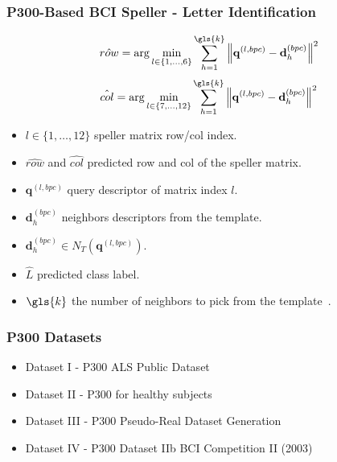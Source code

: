 \documentclass[aspectratio=169]{beamer}
\begin{document}
\begin{frame}
\frametitle{P300-Based BCI Speller - Letter Identification}
\begin{center}
\vspace{-\baselineskip}
\vspace{-\baselineskip}
\begin{equation}
\hat{row} = \arg \min_{l \in \{1,\dots,6\}} \sum_{h=1}^{\gls{k}}  {\left\lVert \mathbf{q}^{(l,bpc)} -  \mathbf{d}_{h}^{(bpc)} \right\rVert}  ^{2}
\label{eq:multiclassificationrow}
\end{equation}
\begin{equation}
\hat{col} = \arg \min_{l \in \{7,\dots,12\}} \sum_{h=1}^{\gls{k}}  {\left\lVert \mathbf{q}^{(l,bpc)} -  \mathbf{d}_{h}^{(bpc)} \right\rVert}  ^{2}
\label{eq:multiclassificationcol}
\end{equation}

\begin{itemize}
\item $l \in \{1,\dots,12\}$ speller matrix row/col index.
\item $\hat{row}$  and $\hat{col}$ predicted row and col of the speller matrix.
\item $\mathbf{q}^{(l,bpc)} $ query descriptor of matrix index $l$.
\item $\mathbf{d}_{h}^{(bpc)} $ neighbors descriptors from the template.
\item $\mathbf{d}_{h}^{(bpc)} \in N_T(  \mathbf{q}^{(l,bpc)} )$.
\item $\hat{L}$ predicted class label.
\item $\gls{k}$ the number of neighbors to pick from the template~.
\end{itemize}

\end{center}
\end{frame}   


\begin{frame}
\frametitle{P300 Datasets}
\begin{center}
\begin{itemize}
 \item<1-> Dataset I - P300 ALS Public Dataset
 \item<2-> Dataset II - P300 for healthy subjects
 \item<3-> Dataset III - P300 Pseudo-Real Dataset Generation
 \item<4-> Dataset IV - P300 Dataset IIb BCI Competition II (2003)
\end{itemize}
\end{center}
\end{frame} 
\end{document}
